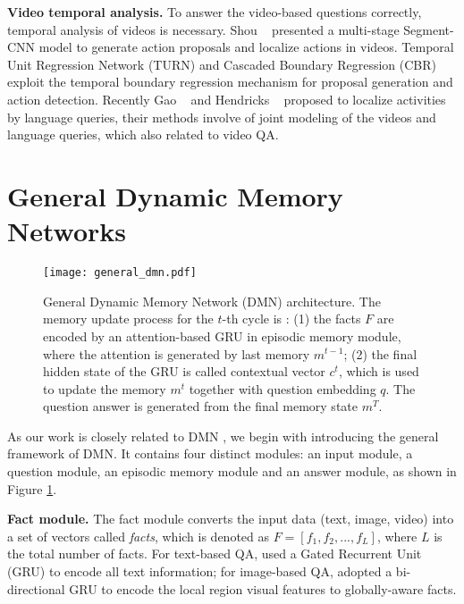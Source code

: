 \documentclass[10pt,twocolumn,letterpaper]{article}
\begin{document}
\textbf{Video temporal analysis.} To answer the video-based questions correctly, temporal analysis of videos is necessary.
Shou \etal~\cite{Shou_2016_CVPR} presented a multi-stage Segment-CNN model to generate action proposals and localize actions in videos.
Temporal Unit Regression Network (TURN) \cite{Gao_2017_ICCV_TURN} and Cascaded Boundary Regression (CBR) \cite{Gao_2017_cbr} exploit the temporal boundary regression mechanism for proposal generation and action detection. 
Recently Gao \etal~\cite{Gao_2017_ICCV_TALL} and Hendricks \etal~\cite{Hendricks_2017_ICCV} proposed to localize activities by language queries, their methods involve of joint modeling of the videos and language queries, which also related to video QA.




\section{General Dynamic Memory Networks}

\begin{figure}[]
  \centering
    \texttt{[image: general\_dmn.pdf]}
    \caption{General Dynamic Memory Network (DMN) \cite{kumar2016ask} architecture. The memory update process for the $t$-th cycle is : (1) the facts $F$ are encoded by an attention-based GRU in episodic memory module, where the attention is generated by last memory $m^{t-1}$; (2) the final hidden state of the GRU is called contextual vector $c^t$, which is used to update the memory $m^t$ together with question embedding $q$. The question answer is generated from the final memory state $m^T$.}
      \label{fig:general_dmn}
\end{figure}


As our work is closely related to DMN \cite{kumar2016ask, xiong2016dynamic}, we begin with introducing the general framework of DMN. It contains four distinct modules: an input module, a question module, an episodic memory module and an answer module, as shown in Figure \ref{fig:general_dmn}. 

\textbf{Fact module.} The fact module converts the input data (\eg text, image, video) into a set of vectors called \emph{facts}, which is denoted as $F = [f_1, f_2,...,f_{L}]$, where $L$ is the total number of facts. For text-based QA, \cite{kumar2016ask} used a Gated Recurrent Unit (GRU) to encode all text information; for image-based QA, \cite{xiong2016dynamic} adopted a bi-directional GRU to encode the local region visual features to globally-aware facts.
\end{document}
